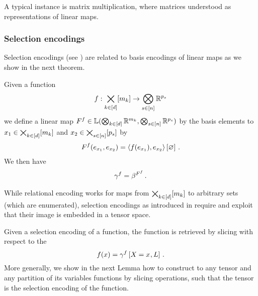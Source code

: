 A typical instance is matrix multiplication, where matrices understood as representations of linear maps.


\subsubsection{Selection encodings}

Selection encodings (see ) are related to basis encodings of linear maps as we show in the next theorem.

\begin{theorem}\label{the:selectionToBasisEncoding}
	Given a function 
		\[ f : \bigtimes_{k\in[d]}[m_{k}] \rightarrow \bigotimes_{s\in[n]}\mathbb{R}^{p_{s}} \]
	we define a linear map $F^{f}\in\mathbb{L}(\bigotimes_{k\in[d]} \mathbb{R}^{m_{k}},\bigotimes_{s\in[n]}\mathbb{R}^{p_{s}})$ by the basis elements to $x_{1} \in\bigtimes_{k\in[d]}[m_{k}]$ and $x_{2}\in\bigtimes_{s\in[n]}[p_{s}]$ by
	\begin{align*}
	 	F^{f}(e_{x_{1}},e_{x_{2}}) 
		= \left\langle f(e_{x_{1}}),e_{x_{2}}\right\rangle \left[ \varnothing \right] \, .  
	\end{align*}
	We then have
	\begin{align*}
		\gamma^{f} = \beta^{F^{f}} \, . 
	\end{align*}
\end{theorem}





While relational encoding works for maps from $\bigtimes_{k\in[d]}[m_{k}]$ to arbitrary sets (which are enumerated), selection encodings as introduced in  require and exploit that their image is embedded in a tensor space.

Given a selection encoding of a function, the function is retrieved by slicing with respect to the 
	\[ f(x) = \gamma^{f}\left[X_{}=x_{},L\right] \, . \]
More generally, we show in the next Lemma how to construct to any tensor and any partition of its variables functions by slicing operations, such that the tensor is the selection encoding of the function.

